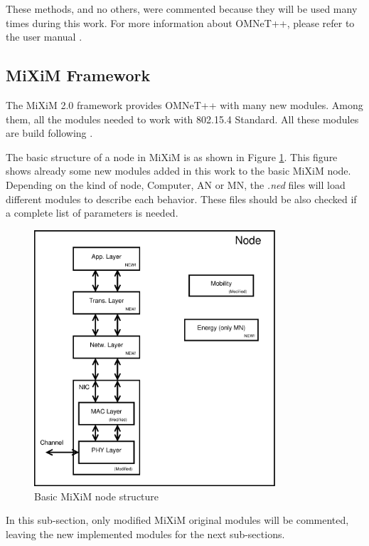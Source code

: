 These methods, and no others, were commented because they will be used many times during this work. For more information about \ac{OMNeT++}, 
please refer to the user manual \cite{manualomnet}.

\subsection{\ac{MiXiM} Framework}

The \ac{MiXiM} 2.0 framework provides \ac{OMNeT++} with many new modules. Among them, all the modules needed to work with 802.15.4 Standard. 
All these modules are build following \cite{IEEE802.15.4-2006}.

The basic structure of a node in \ac{MiXiM} is as shown in Figure \ref{fig:miximmodule}. This figure shows already some new modules added in
this work to the basic \ac{MiXiM} node. Depending on the kind of node, Computer, \ac{AN} or \ac{MN}, the \textit{.ned} files will load 
different modules to describe each behavior. These files should be also checked if a complete list of parameters is needed.

\begin{figure}[ht]
 \begin{center}
  \includegraphics[width=0.8\textwidth]{miximmodule.eps}
 \end{center}
 \caption{Basic \ac{MiXiM} node structure}
 \label{fig:miximmodule}
\end{figure}

In this sub-section, only modified \ac{MiXiM} original modules will be commented, leaving the new implemented modules for the next sub-sections.

